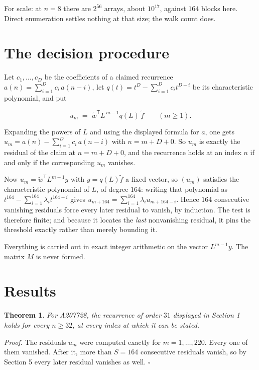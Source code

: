 \documentclass[11pt]{article}
\newtheorem{theorem}{Theorem}
\theoremstyle{definition}
\begin{document}
For scale: at $n = 8$ there are $2^{56}$ arrays, about $10^{17}$, against $164$ blocks here. Direct enumeration settles nothing at that size; the walk count does.

\section{The decision procedure}

Let $c_1,\dots,c_D$ be the coefficients of a claimed recurrence $a(n) = \sum_{i=1}^{D} c_i\,a(n-i)$, let $q(t) = t^{D} - \sum_{i=1}^{D} c_i t^{D-i}$ be its characteristic polynomial, and put

\[u_m \;=\; \tilde w^{\mathsf T} L^{\,m-1} q(L)\,\tilde f \qquad (m \ge 1).\]

Expanding the powers of $L$ and using the displayed formula for $a$, one gets $u_m = a(n) - \sum_{i=1}^{D} c_i\,a(n-i)$ with $n = m + D + 0$. So $u_m$ is exactly the residual of the claim at $n = m + D + 0$, and the recurrence holds at an index $n$ if and only if the corresponding $u_m$ vanishes.

Now $u_m = \tilde w^{\mathsf T} L^{m-1} y$ with $y = q(L)\tilde f$ a fixed vector, so $(u_m)$ satisfies the characteristic polynomial of $L$, of degree $164$: writing that polynomial as $t^{164} - \sum_{i=1}^{164} \lambda_i t^{164-i}$ gives $u_{m+164} = \sum_{i=1}^{164} \lambda_i u_{m+164-i}$. Hence $164$ consecutive vanishing residuals force every later residual to vanish, by induction. The test is therefore finite; and because it locates the {\itshape last} nonvanishing residual, it pins the threshold exactly rather than merely bounding it.

Everything is carried out in exact integer arithmetic on the vector $L^{m-1}y$. The matrix $M$ is never formed.

\section{Results}

\begin{theorem} For A207728, the recurrence of order $31$ displayed in Section 1 holds for every $n \ge 32$, at every index at which it can be stated.\end{theorem}

{\itshape Proof.} The residuals $u_m$ were computed exactly for $m = 1,\dots,220$. Every one of them vanished. After it, more than $S = 164$ consecutive residuals vanish, so by Section 5 every later residual vanishes as well. $\square$
\end{document}
